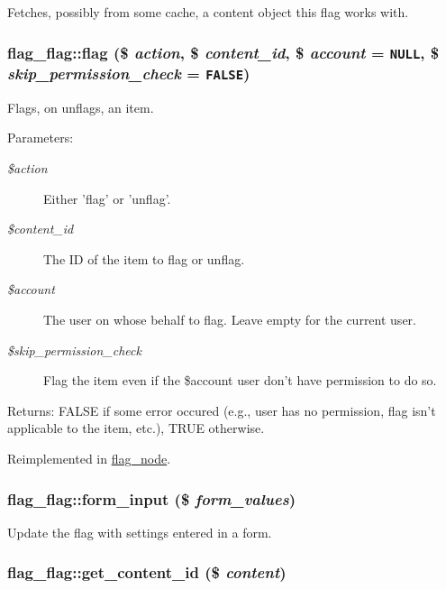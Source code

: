 Fetches, possibly from some cache, a content object this flag works with. \hypertarget{classflag__flag_ed72cdfae0ffef546c45cfa0f616283a}{
\subsubsection[{flag}]{\setlength{\rightskip}{0pt plus 5cm}flag\_\-flag::flag (\$ {\em action}, \/  \$ {\em content\_\-id}, \/  \$ {\em account} = {\tt NULL}, \/  \$ {\em skip\_\-permission\_\-check} = {\tt FALSE})}}
\label{classflag__flag_ed72cdfae0ffef546c45cfa0f616283a}


Flags, on unflags, an item.

\begin{Desc}
\item[Parameters:]
\begin{description}
\item[{\em \$action}]Either 'flag' or 'unflag'. \item[{\em \$content\_\-id}]The ID of the item to flag or unflag. \item[{\em \$account}]The user on whose behalf to flag. Leave empty for the current user. \item[{\em \$skip\_\-permission\_\-check}]Flag the item even if the \$account user don't have permission to do so. \end{description}
\end{Desc}
\begin{Desc}
\item[Returns:]FALSE if some error occured (e.g., user has no permission, flag isn't applicable to the item, etc.), TRUE otherwise. \end{Desc}


Reimplemented in \hyperlink{classflag__node_b9cba098ce624c77b20d67bf51ee8f4f}{flag\_\-node}.\hypertarget{classflag__flag_9e651600ce67f547b629605f38183f2b}{
\subsubsection[{form\_\-input}]{\setlength{\rightskip}{0pt plus 5cm}flag\_\-flag::form\_\-input (\$ {\em form\_\-values})}}
\label{classflag__flag_9e651600ce67f547b629605f38183f2b}


Update the flag with settings entered in a form. \hypertarget{classflag__flag_4da5889b258c2bc28b248678573b881a}{
\subsubsection[{get\_\-content\_\-id}]{\setlength{\rightskip}{0pt plus 5cm}flag\_\-flag::get\_\-content\_\-id (\$ {\em content})}}
\label{classflag__flag_4da5889b258c2bc28b248678573b881a}


